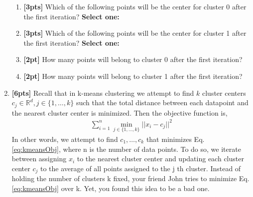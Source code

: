 \documentclass[12pt]{article}
\newcommand{\R}{\mathbb{R}}
\renewcommand{\circle}{\tikz\draw[black] (0,0) circle (1ex);}
\begin{document}
\begin{enumerate}
    \begin{enumerate}[label*=\arabic*.]
    \item \textbf{[3pts]} Which of the following points will be the center for cluster 0 after the first iteration?
    \textbf{Select one:}
    \newpage
    \item \textbf{[3pts]} Which of the following points will be the center for cluster 1 after the first iteration?
    \textbf{Select one:}
    
    \item \textbf{[2pt]} How many points will belong to cluster 0 after the first iteration?
    
    
    \begin{tcolorbox}[fit,height=1cm, width=2cm, blank, borderline={1pt}{-2pt},nobeforeafter]
    \end{tcolorbox}
    
    
    \item \textbf{[2pt]} How many points will belong to cluster 1 after the first iteration?
    
    
    \begin{tcolorbox}[fit,height=1cm, width=2cm, blank, borderline={1pt}{-2pt},nobeforeafter]
    \end{tcolorbox}

   \end{enumerate}
   
   \item \textbf{[6pts]} Recall that in k-means clustering we attempt to find $k$ cluster centers $c_j \in \R^d, j\in \{1,\dots,k\}$ such that the total distance between each datapoint and the nearest cluster center is minimized. Then the objective function is,
   \begin{align}
   \sum_{i=1}^n \min_{j\in\{1,\dots ,k\}} ||x_i - c_j||^2 
   \label{eq:kmeansObj}
   \end{align}
   In other words, we attempt to find $c_1 ,\dots ,c_k$ that minimizes Eq. \eqref{eq:kmeansObj}, where n is the number of data points. To do so, we iterate between assigning $x_i$ to the nearest cluster center and updating each cluster center $c_j$ to the average of all points assigned to the j th cluster.  Instead of holding the number of clusters k fixed, your friend John tries to minimize Eq. \eqref{eq:kmeansObj} over k. Yet, you found this idea to be a bad one. 


\end{enumerate}
\end{document}
